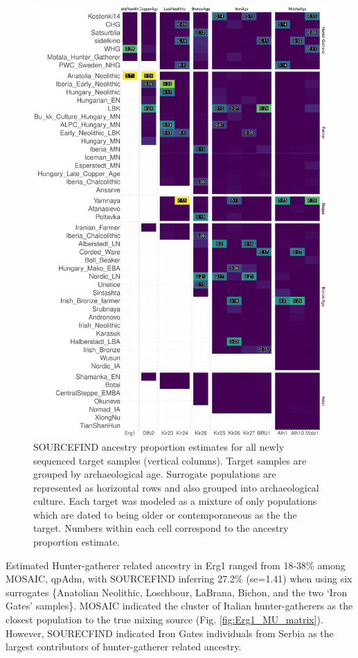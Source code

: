 \begin{figure}[htp]
    \centering
    \includegraphics[width=1.0\textwidth]{../images/chapter4/SOURCEFINDheatmapOlderSurrogates_2.pdf}
    \caption{SOURCEFIND ancestry proportion estimates for all newly sequenced target samples (vertical columns). Target samples are grouped by archaeological age. Surrogate populations are represented as horizontal rows and also grouped into archaeological culture. Each target was modeled as a mixture of only populations which are dated to being older or contemporaneous as the the target. Numbers within each cell correspond to the ancestry proportion estimate.}
    \label{fig:chapter4resultsSFheatmapolder}
\end{figure}


Estimated Hunter-gatherer related ancestry in Erg1 ranged from 18-38\% among MOSAIC, qpAdm, with SOURCEFIND inferring 27.2\% (se=1.41) when using six surrogates \{Anatolian Neolithic, Loschbour, LaBrana, Bichon, and the two `Iron Gates' samples\}. MOSAIC indicated the cluster of Italian hunter-gatherers as the closest population to the true mixing source (Fig. \ref{fig:Erg1_MU_matrix}). However, SOURECFIND indicated Iron Gates individuals from Serbia as the largest contributors of hunter-gatherer related ancestry.


